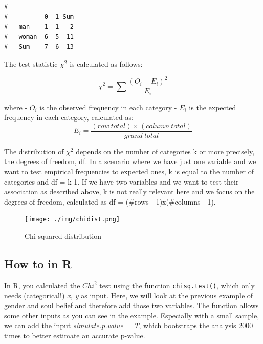\documentclass[
]{book}
\newenvironment{Shaded}{\begin{snugshade}}{\end{snugshade}}
\newcommand{\AttributeTok}[1]{\textcolor[rgb]{0.13,0.29,0.53}{#1}}
\newcommand{\CommentTok}[1]{\textcolor[rgb]{0.56,0.35,0.01}{\textit{#1}}}
\newcommand{\FunctionTok}[1]{\textcolor[rgb]{0.13,0.29,0.53}{\textbf{#1}}}
\newcommand{\NormalTok}[1]{#1}
\newcommand{\SpecialCharTok}[1]{\textcolor[rgb]{0.81,0.36,0.00}{\textbf{#1}}}
\begin{document}
\begin{verbatim}
#        
#          0  1 Sum
#   man    1  1   2
#   woman  6  5  11
#   Sum    7  6  13
\end{verbatim}

The test statistic \(\chi^2\) is calculated as follows:

\[\chi^2 = \sum \frac{(O_i - E_i)^2}{E_i}\]

where
- \(O_i\) is the observed frequency in each category
- \(E_i\) is the expected frequency in each category, calculated as: \[E_i = \frac{(row \ total) \times (column \ total)}{grand \ total}\]

The distribution of \(\chi^2\) depends on the number of categories k or more precisely, the degrees of freedom, df.
In a scenario where we have just one variable and we want to test empirical frequencies to expected ones, k is equal to the number of categories and df = k-1.
If we have two variables and we want to test their association as described above, k is not really relevant here and we focus on the degrees of freedom, calculated as df = (\#rows - 1)x(\#columns - 1).

\begin{figure}
\centering
\texttt{[image: ./img/chidist.png]}
\caption{Chi squared distribution}
\end{figure}

\subsection{How to in R}\label{how-to-in-r}

In R, you calculated the \(Chi^2\) test using the function \texttt{chisq.test()}, which only needs (categorical!) \emph{x, y} as input.
Here, we will look at the previous example of gender and soul belief and therefore add those two variables.
The function allows some other inputs as you can see in the example.
Especially with a small sample, we can add the input \emph{simulate.p.value = T}, which bootstraps the analysis 2000 times to better estimate an accurate p-value.

\begin{Shaded}
\end{Shaded}
\end{document}
